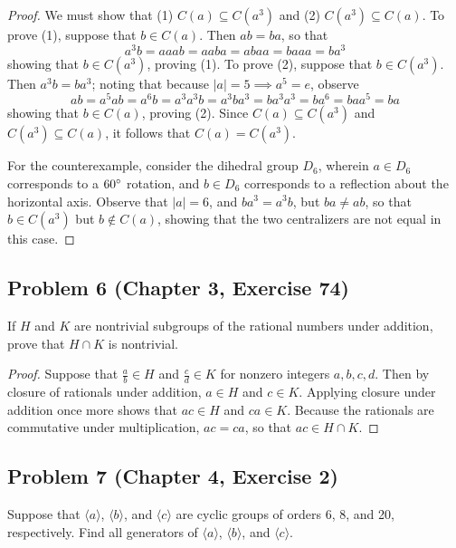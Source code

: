 \documentclass{article}
\begin{document}
\begin{proof}

We must show that (1) $C(a) \subseteq C(a^3)$ and (2) $C(a^3) \subseteq C(a)$. To prove (1), suppose that $b \in C(a)$. Then $ab = ba$, so that
\[a^3b = aaab = aaba = abaa = baaa = ba^3 \]
showing that $b \in C(a^3)$, proving (1). To prove (2), suppose that $b \in C(a^3)$. Then $a^3b = ba^3$; noting that because $|a| = 5 \implies a^5 = e$, observe
\[ ab = a^5ab = a^6b = a^3a^3b = a^3ba^3 = ba^3a^3 = ba^6 = baa^5 = ba\]
showing that $b \in C(a)$, proving (2). Since $C(a) \subseteq C(a^3)$ and $C(a^3) \subseteq C(a)$, it follows that $C(a) = C(a^3)$.

For the counterexample, consider the dihedral group $D_6$, wherein $a \in D_6$ corresponds to a $60 \degree$ rotation, and $b \in D_6$ corresponds to a reflection about the horizontal axis. Observe that $|a| = 6$, and $ba^3 = a^3b$, but $ba \neq ab$, so that $b \in C(a^3)$ but $b \notin C(a)$, showing that the two centralizers are not equal in this case.


\end{proof}


\subsection*{Problem 6 (Chapter 3, Exercise 74)}
If $H$ and $K$ are nontrivial subgroups of the rational numbers under addition, prove that $H \cap K$ is nontrivial.

\begin{proof}

Suppose that $\frac{a}{b} \in H$ and $\frac{c}{d} \in K$ for nonzero integers $a, b, c, d$. Then by closure of rationals under addition, $a \in H$ and $c \in K$. Applying closure under addition once more shows that $ac \in H$ and $ca \in K$. Because the rationals are commutative under multiplication, $ac = ca$, so that $ac \in H \cap K$.

\end{proof}

\subsection*{Problem 7 (Chapter 4, Exercise 2)}

Suppose that $\langle a \rangle$, $\langle b \rangle$, and $\langle c \rangle$ are cyclic groups of orders 6, 8, and 20, respectively. Find all generators of $\langle a \rangle$, $\langle b \rangle$, and $\langle c \rangle$.
\end{document}
